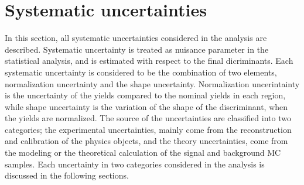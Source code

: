 \chapter{Systematic uncertainties}
\label{chap:systematics}
In this section, all systematic uncertainties considered in the analysis are described. 
Systematic uncertainty is treated as nuisance parameter in the statistical analysis, and is estimated with respect to the final dicriminants.
Each systematic uncertainty is considered to be the combination of two elements, normalization uncertainty and the shape uncertainty. 
Normalization uncerintainty is the uncertainty of the yields compared to the nominal yields in each region, while shape uncertainty is the variation of the shape of the discriminant, when the yields are normalized.
The source of the uncertainties are classified into two categories; the experimental uncertainties, mainly come from the reconstruction and calibration of the physics objects, and the theory uncertainties, come from the modeling or the theoretical calculation of the signal and background MC samples.
Each uncertainty in two categories considered in the analysis is discussed in the following sections.

